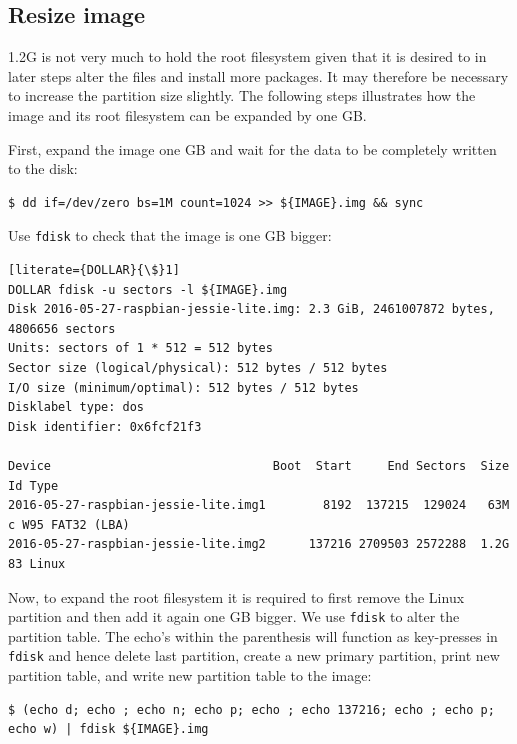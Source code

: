\subsection{Resize image}
1.2G is not very much to hold the root filesystem given that it is desired to
in later steps alter the files and install more packages. It may therefore be
necessary to increase the partition size slightly.
The following steps illustrates how the image and its root filesystem
can be expanded by one \ac{GB}.

First, expand the image one \ac{GB} and wait for the data to be completely written
to the disk:
\begin{lstlisting}[]
$ dd if=/dev/zero bs=1M count=1024 >> ${IMAGE}.img && sync
\end{lstlisting}
\FloatBarrier
\vspace{-5mm}

Use \texttt{fdisk} to check that the image is one \ac{GB} bigger:
\begin{lstlisting}[literate={DOLLAR}{\$}1]
DOLLAR fdisk -u sectors -l ${IMAGE}.img
Disk 2016-05-27-raspbian-jessie-lite.img: 2.3 GiB, 2461007872 bytes, 4806656 sectors
Units: sectors of 1 * 512 = 512 bytes
Sector size (logical/physical): 512 bytes / 512 bytes
I/O size (minimum/optimal): 512 bytes / 512 bytes
Disklabel type: dos
Disk identifier: 0x6fcf21f3

Device                               Boot  Start     End Sectors  Size Id Type
2016-05-27-raspbian-jessie-lite.img1        8192  137215  129024   63M  c W95 FAT32 (LBA)
2016-05-27-raspbian-jessie-lite.img2      137216 2709503 2572288  1.2G 83 Linux
\end{lstlisting}
\FloatBarrier
\vspace{-5mm}

Now, to expand the root filesystem it is required to first remove the Linux partition
and then add it again one \ac{GB} bigger.
We use \texttt{fdisk} to alter the partition table. The echo's within the parenthesis
will function as
key-presses in \texttt{fdisk} and hence delete last partition, create a new
primary partition, print new partition table, and write new partition table
to the image:

\begin{lstlisting}[]
$ (echo d; echo ; echo n; echo p; echo ; echo 137216; echo ; echo p; echo w) | fdisk ${IMAGE}.img
\end{lstlisting}
\FloatBarrier
\vspace{-5mm}

